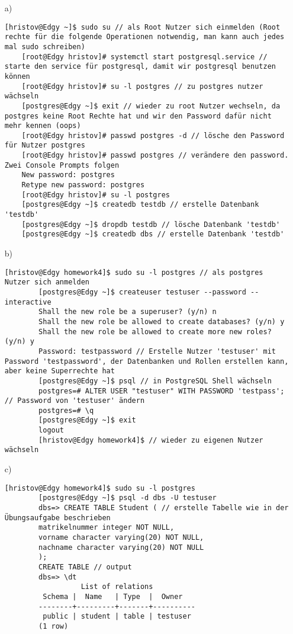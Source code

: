 \begin{itemize}
	\item[a)]

	\begin{lstlisting}[style=Bash]
	[hristov@Edgy ~]$ sudo su // als Root Nutzer sich einmelden (Root rechte für die folgende Operationen notwendig, man kann auch jedes mal sudo schreiben)
	[root@Edgy hristov]# systemctl start postgresql.service // starte den service für postgresql, damit wir postgresql benutzen können
	[root@Edgy hristov]# su -l postgres // zu postgres nutzer wächseln 
	[postgres@Edgy ~]$ exit // wieder zu root Nutzer wechseln, da postgres keine Root Rechte hat und wir den Password dafür nicht mehr kennen (oops)
	[root@Edgy hristov]# passwd postgres -d // lösche den Password für Nutzer postgres
	[root@Edgy hristov]# passwd postgres // verändere den password. Zwei Console Prompts folgen
	New password: postgres
	Retype new password: postgres
	[root@Edgy hristov]# su -l postgres
	[postgres@Edgy ~]$ createdb testdb // erstelle Datenbank 'testdb'
	[postgres@Edgy ~]$ dropdb testdb // lösche Datenbank 'testdb'
	[postgres@Edgy ~]$ createdb dbs // erstelle Datenbank 'testdb'	
	\end{lstlisting}

	\item[b)]

	\begin{lstlisting}[style=Bash]
		[hristov@Edgy homework4]$ sudo su -l postgres // als postgres Nutzer sich anmelden
		[postgres@Edgy ~]$ createuser testuser --password --interactive
		Shall the new role be a superuser? (y/n) n
		Shall the new role be allowed to create databases? (y/n) y
		Shall the new role be allowed to create more new roles? (y/n) y
		Password: testpassword // Erstelle Nutzer 'testuser' mit Password 'testpassword', der Datenbanken und Rollen erstellen kann, aber keine Superrechte hat	
		[postgres@Edgy ~]$ psql // in PostgreSQL Shell wächseln
		postgres=# ALTER USER "testuser" WITH PASSWORD 'testpass'; // Password von 'testuser' ändern
		postgres=# \q
		[postgres@Edgy ~]$ exit
		logout
		[hristov@Edgy homework4]$ // wieder zu eigenen Nutzer wächseln 

	\end{lstlisting}

	\item[c)]

	\begin{lstlisting}[style=Bash]
		[hristov@Edgy homework4]$ sudo su -l postgres
		[postgres@Edgy ~]$ psql -d dbs -U testuser
		dbs=> CREATE TABLE Student ( // erstelle Tabelle wie in der Übungsaufgabe beschrieben
		matrikelnummer integer NOT NULL,
		vorname character varying(20) NOT NULL,
		nachname character varying(20) NOT NULL     
		);                                                     
		CREATE TABLE // output
		dbs=> \dt
		          List of relations
		 Schema |  Name   | Type  |  Owner   
		--------+---------+-------+----------
		 public | student | table | testuser
		(1 row)


\end{lstlisting}
\end{itemize}
